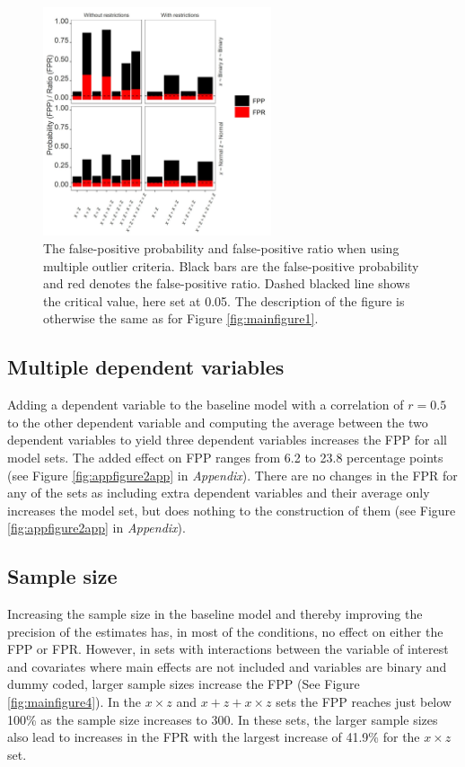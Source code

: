 \begin{figure}[hbt!]
\includegraphics[width=0.6\textwidth]{R/Analysis/Result/Figures/Figure1B.jpeg}
\centering
\caption{The false-positive probability and false-positive ratio when using multiple outlier criteria. Black bars are the false-positive probability and red denotes the false-positive ratio. Dashed blacked line shows the critical value, here set at 0.05. The description of the figure is otherwise the same as for Figure \ref{fig:mainfigure1}.}
\label{fig:mainfigure3}
\end{figure}

\subsection{Multiple dependent variables}
Adding a dependent variable to the baseline model with a correlation of $r=0.5$ to the other dependent variable and computing the average between the two dependent variables to yield three dependent variables increases the FPP for all model sets. The added effect on FPP ranges from 6.2 to 23.8 percentage points (see Figure \ref{fig:appfigure2app} in \textit{Appendix}). There are no changes in the FPR for any of the sets as including extra dependent variables and their average only increases the model set, but does nothing to the construction of them (see Figure \ref{fig:appfigure2app} in \textit{Appendix}).   

\subsection{Sample size}
Increasing the sample size in the baseline model and thereby improving the precision of the estimates has, in most of the conditions, no effect on either the FPP or FPR. However, in sets with interactions between the variable of interest and covariates where main effects are not included and variables are binary and dummy coded, larger sample sizes increase the FPP (See Figure \ref{fig:mainfigure4}). In the $x \times z$ and $x + z+ x \times z$ sets the FPP reaches just below 100\% as the sample size increases to 300. In these sets, the larger sample sizes also lead to increases in the FPR with the largest increase of 41.9\% for the $x \times z$ set.  


